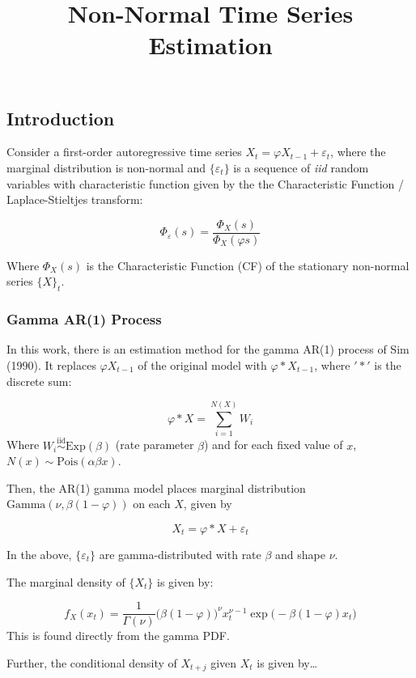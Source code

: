 \documentclass[
  letterpaper,
  DIV=11,
  numbers=noendperiod]{scrartcl}
\title{Non-Normal Time Series Estimation}
\author{}
\date{}
\begin{document}
\maketitle


\subsection{Introduction}\label{introduction}

Consider a first-order autoregressive time series
\(X_t = \varphi X_{t-1} + \varepsilon_t\), where the marginal
distribution is non-normal and \(\{\varepsilon_t\}\) is a sequence of
\emph{iid} random variables with characteristic function given by the
the Characteristic Function / Laplace-Stieltjes transform:

\[
\Phi_{\varepsilon}(s) = \dfrac{\Phi_X(s)}{\Phi_X(\varphi s)}
\]

Where \(\Phi_X(s)\) is the Characteristic Function (CF) of the
stationary non-normal series \(\{X\}_t\).

\subsubsection{Gamma AR(1) Process}\label{gamma-ar1-process}

In this work, there is an estimation method for the gamma AR(1) process
of Sim (1990). It replaces \(\varphi X_{t-1}\) of the original model
with \(\varphi \ast X_{t-1}\), where \('\ast'\) is the discrete sum:

\[
\varphi \ast X = \sum_{i = 1}^{N(X)} W_i
\] Where \(W_i \overset{\text{iid}}{\sim} \text{Exp}(\beta)\) (rate
parameter \(\beta\)) and for each fixed value of \(x\),
\(N(x) \sim \text{Pois}(\alpha \beta x)\).

Then, the AR(1) gamma model places marginal distribution
\(\text{Gamma}(\nu, \beta(1-\varphi))\) on each \(X\), given by

\[
X_t = \varphi \ast X + \varepsilon_t
\]

In the above, \(\{\varepsilon_t\}\) are gamma-distributed with rate
\(\beta\) and shape \(\nu\).

The marginal density of \(\{X_t\}\) is given by:

\[
f_{X}(x_t) = \dfrac{1}{\Gamma(\nu)} \big(\beta(1 - \varphi) \big)^{\nu}x_t^{\nu - 1}\exp\Big(-\beta(1-\varphi)x_t \Big)
\] This is found directly from the gamma PDF.

Further, the conditional density of \(X_{t+j}\) given \(X_{t}\) is given
by\ldots{}
\end{document}
